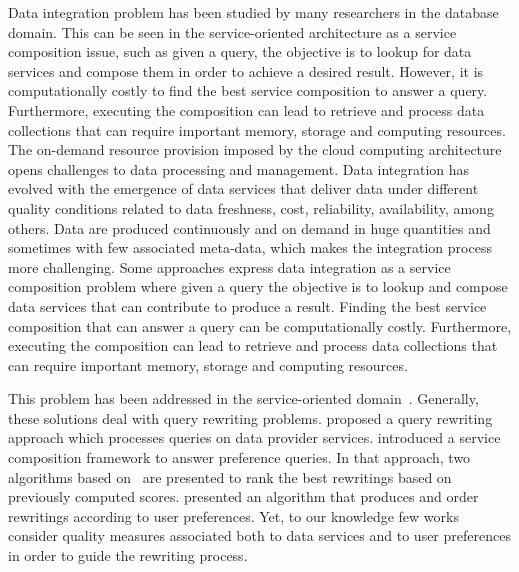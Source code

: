 Data integration problem has been studied by many researchers in the database domain.
This can be seen in the service-oriented architecture as a service composition issue, such as given a query, the objective is to lookup for data services and compose them in order to achieve a desired result. 
%
However, it is computationally costly to find the best service composition to answer a query. 
Furthermore, executing the composition can lead to retrieve and process data collections that can require important memory, storage and computing resources.
The on-demand resource provision imposed by the cloud computing architecture opens challenges to data processing and management.
Data integration has evolved with the emergence of data services that
deliver data under different quality conditions related to data freshness, cost, reliability,
availability, among others. Data are produced continuously and on demand in huge
quantities and sometimes with few associated meta-data, which makes the
integration process more challenging. Some approaches express data integration
as a service composition problem where given a query the objective is to lookup
and compose data services that can contribute to produce a result. Finding the
best service composition that can answer a query can be computationally costly.
Furthermore,  executing the composition can lead to retrieve and process data
collections that can require important memory, storage and computing resources.     

This problem has been addressed in the service-oriented
domain~\cite{Barhamgi2010,Benouaret2011,ba2014}.
Generally, these solutions deal with query rewriting problems.
\cite{Barhamgi2010} proposed a query rewriting approach which processes queries
on data provider services. \cite{Benouaret2011} introduced a service composition
framework to answer preference queries. In that approach, two algorithms based
on~\cite{Barhamgi2010} are presented to rank the best rewritings based on previously computed scores.
\cite{ba2014} presented an algorithm that produces and order rewritings
according to user preferences. Yet, to our knowledge few works consider quality
measures associated both to data services and to user preferences in order to
guide the rewriting process. 

